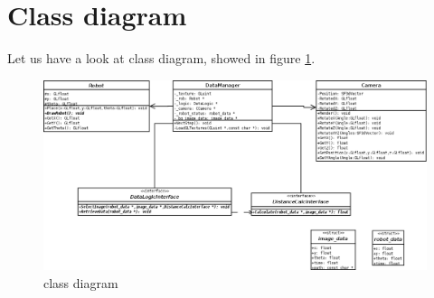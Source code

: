 \section{Class diagram}
\label{rear:classdiagram}

Let us have a look at \framework{} class diagram, 
showed in figure \ref{fig:class_diagram}.

\begin{figure}[!h]
  \begin{center}
    \includegraphics[width=\textwidth]{img/rear_class_diagram.png}
    \caption{\framework{} class diagram}
    \label{fig:class_diagram}
  \end{center}
\end{figure}

